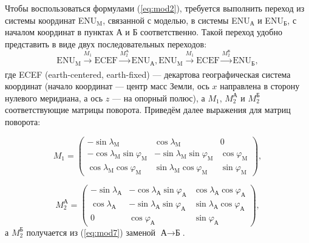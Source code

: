 \documentclass[12pt,a4paper]{article}
\renewcommand{\vec}{\mathbf}
\begin{document}
Чтобы воспользоваться формулами (\ref{eq:mod2}), требуется выполнить переход из системы координат ENU$_\text{M}$, связанной с моделью, в системы ENU$_\text{А}$ и ENU$_\text{Б}$, с началом координат в пунктах А и Б соответственно. Такой переход удобно представить в виде двух последовательных переходов:
 \begin{equation}\label{eq:mod5}
 \text{ENU}_\text{M} \xrightarrow[]{M_1} \text{ECEF} \xrightarrow[]{M_2^\text{А}} \text{ENU}_\text{А}, \text{ENU}_\text{M} \xrightarrow[]{M_1} \text{ECEF} \xrightarrow[]{M_2^\text{Б}} \text{ENU}_\text{Б}, 
 \end{equation}
где ECEF (earth-centered, earth-fixed) --- декартова географическая система координат (начало координат --- центр масс Земли, ось $x$ направлена в сторону нулевого меридиана, а ось $z$ --- на опорный полюс), а $M_1$, $M_2^\text{А}$ и $M_2^\text{Б}$ соответствующие матрицы поворота. Приведём далее выражения для матриц поворота:

\begin{equation}\label{eq:mod6}
M_1=\begin{pmatrix} -\sin{\lambda_\text{M}} & \cos{\lambda_\text{M}} & 0 \\ -\cos{\lambda_\text{M}}\sin{\varphi_\text{M}} & -\sin{\lambda_\text{M}}\sin{\varphi_\text{M}} & \cos{\varphi_\text{M}}\\ \cos{\lambda_\text{M}}\cos{\varphi_\text{M}} & \sin{\lambda_\text{M}}\cos{\varphi_\text{M}} & \sin{\varphi_\text{M}} \end{pmatrix},
\end{equation}

\begin{equation}\label{eq:mod7}
M_2^\text{А}=\begin{pmatrix} -\sin{\lambda_\text{А}} & 
-\cos{\lambda_\text{А}}\sin{\varphi_\text{А}} &
\cos{\lambda_\text{А}}\cos{\varphi_\text{А}} \\
\cos{\lambda_\text{А}} &
-\sin{\lambda_\text{А}}\sin{\varphi_\text{А}} &
\sin{\lambda_\text{А}}\cos{\varphi_\text{А}} \\
0 & \cos{\varphi_\text{А}} & \sin{\varphi_\text{А}} \end{pmatrix},
\end{equation}
а $M_2^\text{Б}$ получается из (\ref{eq:mod7}) заменой $\text{А} \rightarrow \text{Б}$.
\end{document}
